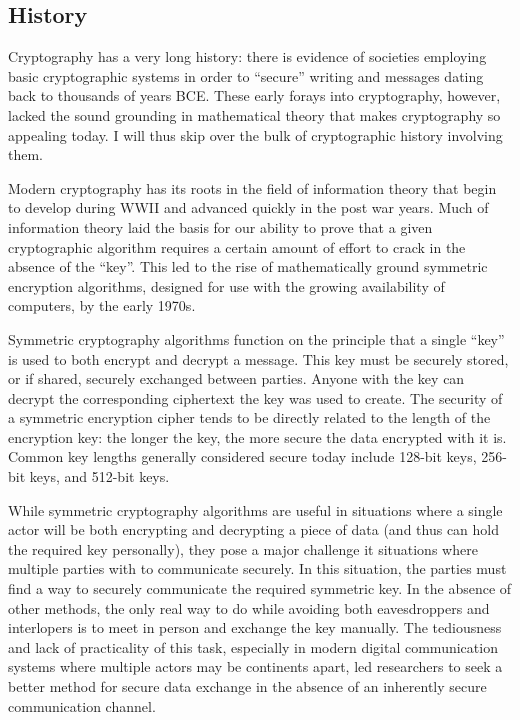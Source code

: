 \documentclass{sig-alternate}
\begin{document}
\subsection{History}

Cryptography has a very long history: there is evidence of societies
employing basic cryptographic systems in order to ``secure'' writing
and messages dating back to thousands of years BCE. These early forays
into cryptography, however, lacked the sound grounding in mathematical
theory that makes cryptography so appealing today. I will thus skip
over the bulk of cryptographic history involving them.

Modern cryptography has its roots in the field of information theory
that begin to develop during WWII and advanced quickly in the post war
years. Much of information theory laid the basis for our ability to
prove that a given cryptographic algorithm requires a certain amount
of effort to crack in the absence of the ``key''. This led to the rise
of mathematically ground symmetric encryption algorithms, designed for
use with the growing availability of computers, by the early 1970s.

Symmetric cryptography algorithms function on the principle that a
single ``key'' is used to both encrypt and decrypt a message. This key
must be securely stored, or if shared, securely exchanged between
parties. Anyone with the key can decrypt the corresponding ciphertext
the key was used to create. The security of a symmetric encryption
cipher tends to be directly related to the length of the encryption
key: the longer the key, the more secure the data encrypted with it
is. Common key lengths generally considered secure today include
128-bit keys, 256-bit keys, and 512-bit keys.

While symmetric cryptography algorithms are useful in situations where
a single actor will be both encrypting and decrypting a piece of data
(and thus can hold the required key personally), they pose a major
challenge it situations where multiple parties with to communicate
securely. In this situation, the parties must find a way to securely
communicate the required symmetric key. In the absence of other
methods, the only real way to do while avoiding both eavesdroppers and
interlopers is to meet in person and exchange the key manually. The
tediousness and lack of practicality of this task, especially in
modern digital communication systems where multiple actors may be
continents apart, led researchers to seek a better method for secure
data exchange in the absence of an inherently secure communication
channel.
\end{document}
